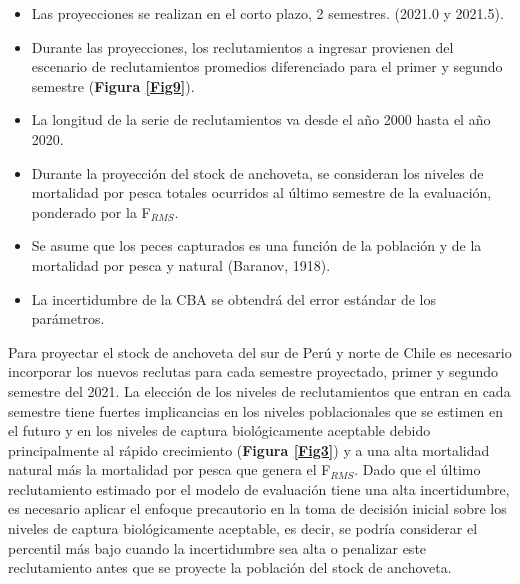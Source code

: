 \documentclass[letter,11pt]{article}
\begin{document}
\begin{itemize}
\item
  Las proyecciones se realizan en el corto plazo, 2 semestres. (2021.0 y
  2021.5).
\item
  Durante las proyecciones, los reclutamientos a ingresar provienen del
  escenario de reclutamientos promedios diferenciado para el primer y
  segundo semestre (\textbf{Figura \ref{Fig9}}).
\item
  La longitud de la serie de reclutamientos va desde el a\~{n}o 2000 hasta
  el a\~{n}o 2020.
\item
  Durante la proyecci\'on del stock de anchoveta, se consideran los
  niveles de mortalidad por pesca totales ocurridos al \'ultimo semestre
  de la evaluaci\'on, ponderado por la F$_{RMS}$.
\item
  Se asume que los peces capturados es una funci\'on de la poblaci\'on y de
  la mortalidad por pesca y natural (Baranov, 1918).
\item
  La incertidumbre de la CBA se obtendr\'a del error est\'andar de los
  par\'ametros.
\end{itemize}

Para proyectar el stock de anchoveta del sur de Per\'u y norte de Chile es
necesario incorporar los nuevos reclutas para cada semestre proyectado,
primer y segundo semestre del 2021. La elecci\'on de los niveles de
reclutamientos que entran en cada semestre tiene fuertes implicancias en
los niveles poblacionales que se estimen en el futuro y en los niveles
de captura biol\'ogicamente aceptable debido principalmente al r\'apido
crecimiento (\textbf{Figura \ref{Fig3}}) y a una alta mortalidad natural
m\'as la mortalidad por pesca que genera el F$_{RMS}$. Dado que el
\'ultimo reclutamiento estimado por el modelo de evaluaci\'on tiene una alta
incertidumbre, es necesario aplicar el enfoque precautorio en la toma de
decisi\'on inicial sobre los niveles de captura biol\'ogicamente aceptable,
es decir, se podr\'ia considerar el percentil m\'as bajo cuando la
incertidumbre sea alta o penalizar este reclutamiento antes que se
proyecte la poblaci\'on del stock de anchoveta.
\end{document}
